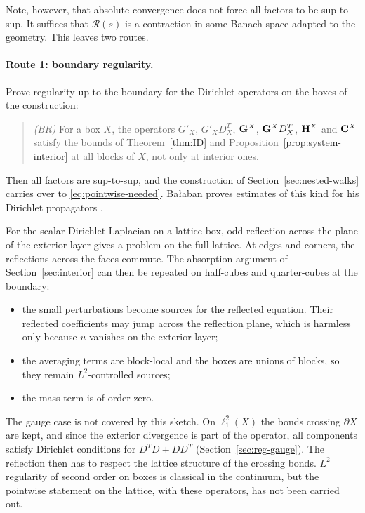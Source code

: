 Note, however, that absolute convergence does not force all factors to be sup-to-sup. It suffices that $\mathcal R(s)$ is a contraction in some Banach space adapted to the geometry. This leaves two routes.

\paragraph{Route 1: boundary regularity.} Prove regularity up to the boundary for the Dirichlet operators on the boxes of the construction:
\begin{quote}
\emph{(BR)} For a box $X$, the operators $G'_X$, $G'_XD^T_X$, $\mathbf G^X$, $\mathbf G^XD^T_X$, $\mathbf H^X$ and $\mathbf C^X$ satisfy the bounds of Theorem~\ref{thm:ID} and Proposition~\ref{prop:system-interior} at all blocks of $X$, not only at interior ones.
\end{quote}
Then all factors are sup-to-sup, and the construction of Section~\ref{sec:nested-walks} carries over to \eqref{eq:pointwise-needed}. Ba\l aban proves estimates of this kind for his Dirichlet propagators \cite{BalGreen,BalPropI,BalBackground}.

For the scalar Dirichlet Laplacian on a lattice box, odd reflection across the plane of the exterior layer gives a problem on the full lattice. At edges and corners, the reflections across the faces commute. The absorption argument of Section~\ref{sec:interior} can then be repeated on half-cubes and quarter-cubes at the boundary:
\begin{itemize}
\item the small perturbations become sources for the reflected equation. Their reflected coefficients may jump across the reflection plane, which is harmless only because $u$ vanishes on the exterior layer;
\item the averaging terms are block-local and the boxes are unions of blocks, so they remain $L^2$-controlled sources;
\item the mass term is of order zero.
\end{itemize}
The gauge case is not covered by this sketch. On $\ell^2_1(X)$ the bonds crossing $\partial X$ are kept, and since the exterior divergence is part of the operator, all components satisfy Dirichlet conditions for $D^TD+DD^T$ (Section~\ref{sec:reg-gauge}). The reflection then has to respect the lattice structure of the crossing bonds. $L^2$ regularity of second order on boxes is classical in the continuum, but the pointwise statement on the lattice, with these operators, has not been carried out.

